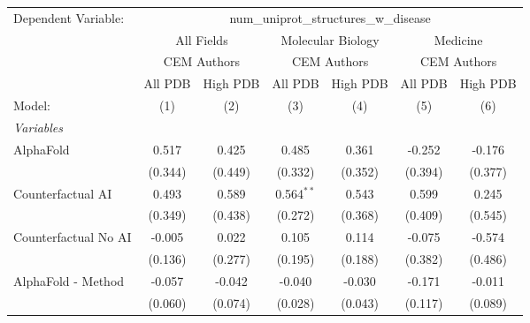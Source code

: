 \begingroup
\centering
\begin{tabular}{lcccccc}
   \tabularnewline \midrule \midrule
   Dependent Variable: & \multicolumn{6}{c}{num\_uniprot\_structures\_w\_disease}\\
 & \multicolumn{2}{c}{All Fields} & \multicolumn{2}{c}{Molecular Biology} & \multicolumn{2}{c}{Medicine} \\
\cmidrule(lr){2-3} \cmidrule(lr){4-5} \cmidrule(lr){6-7}
 & \multicolumn{2}{c}{CEM Authors} & \multicolumn{2}{c}{CEM Authors} & \multicolumn{2}{c}{CEM Authors} \\
\cmidrule(lr){2-3} \cmidrule(lr){4-5} \cmidrule(lr){6-7}
 & \multicolumn{1}{c}{All PDB} & \multicolumn{1}{c}{High PDB} & \multicolumn{1}{c}{All PDB} & \multicolumn{1}{c}{High PDB} & \multicolumn{1}{c}{All PDB} & \multicolumn{1}{c}{High PDB} \\
\cmidrule(lr){2-2} \cmidrule(lr){3-3} \cmidrule(lr){4-4} \cmidrule(lr){5-5} \cmidrule(lr){6-6} \cmidrule(lr){7-7}
   Model:                                                     & (1)     & (2)     & (3)           & (4)           & (5)           & (6)\\  
   \midrule
   \emph{Variables}\\
   AlphaFold                                                  & 0.517   & 0.425   & 0.485         & 0.361         & -0.252        & -0.176\\   
                                                              & (0.344) & (0.449) & (0.332)       & (0.352)       & (0.394)       & (0.377)\\   
   Counterfactual AI                                          & 0.493   & 0.589   & 0.564$^{**}$  & 0.543         & 0.599         & 0.245\\   
                                                              & (0.349) & (0.438) & (0.272)       & (0.368)       & (0.409)       & (0.545)\\   
   Counterfactual No AI                                       & -0.005  & 0.022   & 0.105         & 0.114         & -0.075        & -0.574\\   
                                                              & (0.136) & (0.277) & (0.195)       & (0.188)       & (0.382)       & (0.486)\\   
   AlphaFold - Method                                         & -0.057  & -0.042  & -0.040        & -0.030        & -0.171        & -0.011\\   
                                                              & (0.060) & (0.074) & (0.028)       & (0.043)       & (0.117)       & (0.089)\\   

\end{tabular}
